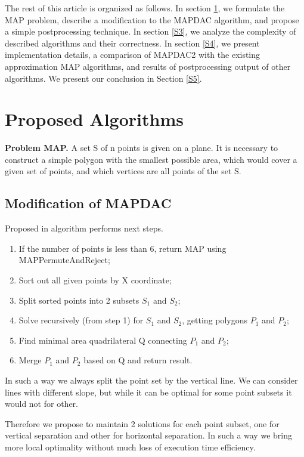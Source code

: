 \documentclass[conference]{IEEEtran}
\begin{document}
		The rest of this article is organized as follows.
		In section \ref{S2}, we formulate the MAP problem, describe a modification to the MAP{\textunderscore}DAC algorithm, and propose a simple postprocessing technique.
		In section \ref{S3}, we analyze the complexity of described algorithms and their correctness.
		In section \ref{S4}, we present implementation details, a comparison of MAP{\textunderscore}DAC2 with the existing approximation MAP algorithms, and results of postprocessing output of other algorithms.
		We present our conclusion in Section \ref{S5}.
	
	
	\section{Proposed Algorithms}
	\label{S2}
		\textbf{Problem MAP.}
		A set S of n points is given on a plane.
		It is necessary to construct a simple polygon with the smallest possible area, which would cover a given set of points, and which vertices are all points of the set S.
	
		\subsection{Modification of MAP{\textunderscore}DAC}
			Proposed in \cite{link13} algorithm performs next steps.
			\begin{enumerate}
				\item If the number of points is less than 6, return MAP using MAP{\textunderscore}PermuteAndReject;
				\item Sort out all given points by X coordinate;
				\item Split sorted points into 2 subsets $S_{1}$ and $S_{2}$;
				\item Solve recursively (from step 1) for $S_{1}$ and $S_{2}$, getting polygons $P_{1}$ and $P_{2}$;
				\item Find minimal area quadrilateral Q connecting $P_{1}$ and $P_{2}$;
				\item Merge $P_{1}$ and $P_{2}$ based on Q and return result.
			\end {enumerate}
			
			In such a way we always split the point set by the vertical line.
			We can consider lines with different slope, but while it can be optimal for some point subsets it would not for other.
			
			Therefore we propose to maintain 2 solutions for each point subset, one for vertical separation and other for horizontal separation.
			In such a way we bring more local optimality without much loss of execution time efficiency.
				
\end{document}
